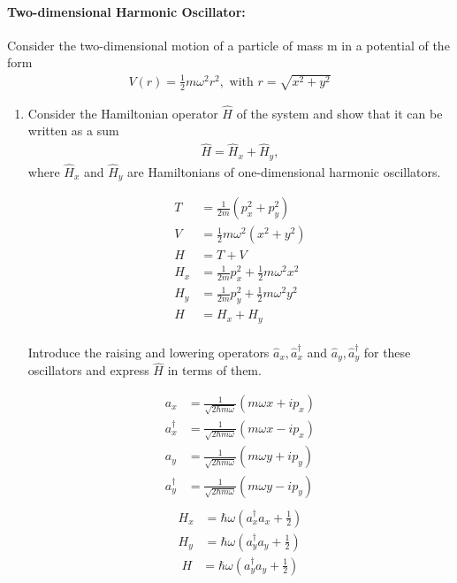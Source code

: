 \documentclass[11pt,a4paper]{scrartcl}
\begin{document}
    \paragraph{Two-dimensional Harmonic Oscillator:} Consider the two-dimensional motion of a particle of mass m in a potential of the form
    \begin{align*}
        V(r) = \frac{1}{2} m \omega^2 r^2, \text{ with } r = \sqrt{x^2 + y^2}
    \end{align*}

    \begin{enumerate}
        \item Consider the Hamiltonian operator $\hat{H}$ of the system and show that it can be written as a sum
        \begin{align*}
            \hat{H} = \hat{H}_x + \hat{H}_y,
        \end{align*}
        where $\hat{H}_x$ and $\hat{H}_y$ are Hamiltonians of one-dimensional harmonic oscillators.
        \begin{calculationbox}
            \begin{align*}
                T &= \frac{1}{2m} (p_x^2 + p_y^2)\\
                V &= \frac{1}{2} m\omega^2 (x^2 + y^2)\\
                H &= T + V\\
                H_x &= \frac{1}{2m} p_x^2 + \frac{1}{2} m \omega^2 x^2\\
                H_y &= \frac{1}{2m} p_y^2 + \frac{1}{2} m \omega^2 y^2\\
                H &= H_x + H_y\\
            \end{align*}
        \end{calculationbox}
        Introduce the raising and lowering operators $\hat{a}_x, \hat{a}_x^\dagger$ and $\hat{a}_y, \hat{a}_y^\dagger$ for these oscillators and express $\hat{H}$ in terms of them.
        \begin{calculationbox}
            \begin{align*}
                a_x &= \frac{1}{\sqrt{2 \hbar m \omega}} (m\omega x + i p_x)\\
                a_x^\dagger &= \frac{1}{\sqrt{2 \hbar m \omega}} (m\omega x - i p_x)\\
                a_y &= \frac{1}{\sqrt{2 \hbar m \omega}} (m\omega y + i p_y)\\
                a_y^\dagger &= \frac{1}{\sqrt{2 \hbar m \omega}} (m\omega y - i p_y)\\
            \end{align*}
            \begin{align*}
                H_x &= \hbar \omega (a_x^\dagger a_x + \frac{1}{2})\\
                H_y &= \hbar \omega (a_y^\dagger a_y + \frac{1}{2})
            \end{align*}
            \begin{align*}
                H &= \hbar \omega (a_y^\dagger a_y + \frac{1}{2})
            \end{align*}
        \end{calculationbox}
        

\end{enumerate}
\end{document}
